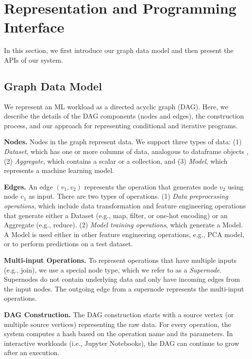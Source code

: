 \section{Representation and Programming Interface}\label{representation-and-api}
In this section, we first introduce our graph data model and then present the APIs of our system.

\subsection{Graph Data Model}
We represent an ML workload as a directed acyclic graph (DAG).
Here, we describe the details of the DAG components (nodes and edges), the construction process, and our approach for representing conditional and iterative programs. 

\textbf{Nodes.}
Nodes in the graph represent data.
We support three types of data: (1) \textit{Dataset}, which has one or more columns of data, analogous to dataframe objects \cite{mckinney-proc-scipy-2010}, (2) \textit{Aggregate}, which contains a scalar or a collection, and (3) \textit{Model}, which represents a machine learning model.

\textbf{Edges.}
An edge $(v_1,v_2)$ represents the operation that generates node $v_2$ using node $v_1$ as input.
There are two types of operations. 
(1) \textit{Data preprocessing operations}, which include data transformation and feature engineering operations that generate either a Dataset (e.g., map, filter, or one-hot encoding)  or an Aggregate (e.g., reduce). 
(2) \textit{Model training operations}, which generate a Model.
A Model is used either in other feature engineering operations, e.g., PCA model, or to perform predictions on a test dataset.

\textbf{Multi-input Operations.}
To represent operations that have multiple inputs (e.g., join), we use a special node type, which we refer to as a \textit{Supernode}.
Supernodes do not contain underlying data and only have incoming edges from the input nodes.
The outgoing edge from a supernode represents the multi-input operations.

\textbf{DAG Construction.}
The DAG construction starts with a source vertex (or multiple source vertices) representing the raw data.
For every operation, the system computes a hash based on the operation name and its parameters.
In interactive workloads (i.e., Jupyter Notebooks), the DAG can continue to grow after an execution.

